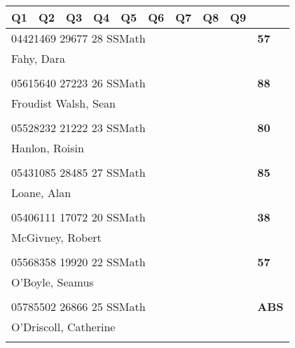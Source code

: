 \documentclass[a4paper,12pt]{article}
\begin{document}
\begin{tabular}{
   |p{9mm}|
    p{9mm}|
    p{9mm}|
    p{9mm}|
    p{9mm}|
    p{9mm}|
    p{9mm}|
    p{9mm}|
    p{9mm}|
    p{9mm}|}
\hline\hline
Q1 & Q2 & Q3 & Q4 & Q5 & Q6 & Q7 & Q8 & Q9 &     \\
\hline\hline
\multicolumn{9}{|l|}{04421469 29677 28 SSMath} & \textbf{57} \\
\hline
\multicolumn{10}{|l|}{Fahy, Dara} \\
\hline
   \vrule height8mm width0pt depth2mm 
      &    &    &    &    &    &    &    &    &     \\
\hline\hline
\multicolumn{9}{|l|}{05615640 27223 26 SSMath} & \textbf{88} \\
\hline
\multicolumn{10}{|l|}{Froudist Walsh, Sean} \\
\hline
   \vrule height8mm width0pt depth2mm 
      &    &    &    &    &    &    &    &    &     \\
\hline\hline
\multicolumn{9}{|l|}{05528232 21222 23 SSMath} & \textbf{80} \\
\hline
\multicolumn{10}{|l|}{Hanlon, Roisin} \\
\hline
   \vrule height8mm width0pt depth2mm 
      &    &    &    &    &    &    &    &    &     \\
\hline\hline
\multicolumn{9}{|l|}{05431085 28485 27 SSMath} & \textbf{85} \\
\hline
\multicolumn{10}{|l|}{Loane, Alan} \\
\hline
   \vrule height8mm width0pt depth2mm 
      &    &    &    &    &    &    &    &    &     \\
\hline\hline
\multicolumn{9}{|l|}{05406111 17072 20 SSMath} & \textbf{38} \\
\hline
\multicolumn{10}{|l|}{McGivney, Robert} \\
\hline
   \vrule height8mm width0pt depth2mm 
      &    &    &    &    &    &    &    &    &     \\
\hline\hline
\multicolumn{9}{|l|}{05568358 19920 22 SSMath} & \textbf{57} \\
\hline
\multicolumn{10}{|l|}{O'Boyle, Seamus} \\
\hline
   \vrule height8mm width0pt depth2mm 
      &    &    &    &    &    &    &    &    &     \\
\hline\hline
\multicolumn{9}{|l|}{05785502 26866 25 SSMath} & \textbf{ABS} \\
\hline
\multicolumn{10}{|l|}{O'Driscoll, Catherine} \\
\hline
   \vrule height8mm width0pt depth2mm 

\end{tabular}
\end{document}
